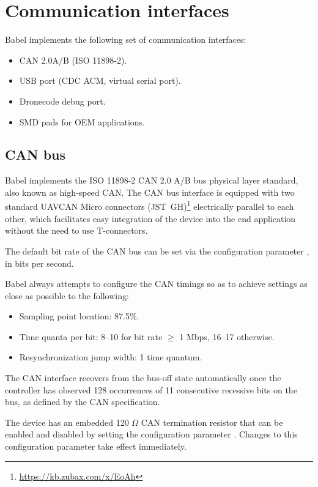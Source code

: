 \documentclass{zubaxdoc}
\begin{document}
\section{Communication interfaces}

Babel implements the following set of communication interfaces:
\begin{itemize}
    \item CAN 2.0A/B (ISO 11898-2).
    \item USB port (CDC ACM, virtual serial port).
    \item Dronecode debug port.
    \item SMD pads for OEM applications.
\end{itemize}

\subsection{CAN bus}\label{sec:can_bus}

Babel implements the ISO 11898-2 CAN 2.0 A/B bus physical layer standard, also known as high-speed CAN.
The CAN bus interface is equipped with two standard
UAVCAN Micro connectors (JST~GH)\footnote{\url{https://kb.zubax.com/x/EoAh}}
electrically parallel to each other,
which facilitates easy integration of the device into the end application without the need to use T-connectors.

The default bit rate of the CAN bus can be set via the configuration parameter ,
in bits per second.

Babel always attempts to configure the CAN timings so as to achieve settings as close as possible to the
following:
\begin{itemize}
    \item Sampling point location: 87.5\%.
    \item Time quanta per bit: 8--10 for bit rate $\geq$ 1 Mbps, 16--17 otherwise.
    \item Resynchronization jump width: 1 time quantum.
\end{itemize}

The CAN interface recovers from the bus-off state automatically once the controller has
observed 128 occurrences of 11 consecutive recessive bits on the bus, as defined by the CAN specification.

The device has an embedded 120 $\Omega$ CAN termination resistor that can be enabled and disabled
by setting the configuration parameter .
Changes to this configuration parameter take effect immediately.
\end{document}
